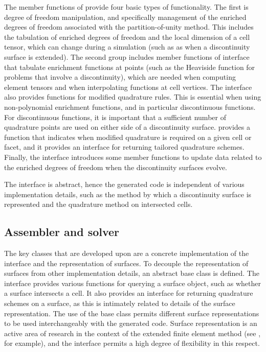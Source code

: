 The member functions of  provide four basic types
of functionality. The first is degree of freedom manipulation, and
specifically management of the enriched degrees of freedom associated
with the partition-of-unity method.  This includes the tabulation of
enriched degrees of freedom and the local dimension of a cell tensor,
which can change during a simulation (such as as when a discontinuity
surface is extended). The second group includes member functions
of  interface that tabulate enrichment functions at
points (such as the Heaviside function for problems that involve a
discontinuity), which are needed when computing element tensors and
when interpolating functions at cell vertices. The 
interface also provides functions for modified quadrature rules. This
is essential when using non-polynomial enrichment functions, and in
particular discontinuous functions. For discontinuous functions, it is
important that a sufficient number of quadrature points are used on either
side of a discontinuity surface.  provides a function
that indicates when modified quadrature is required on a given cell or
facet, and it provides an interface for returning tailored quadrature
schemes. Finally, the  interface introduces some member
functions to update data related to the enriched degrees of freedom when
the discontinuity surfaces evolve.

The  interface is abstract, hence the generated code
is independent of various implementation details, such as the method by
which a discontinuity surface is represented and the quadrature method
on intersected cells.

\subsection{Assembler and solver}

The key classes that are developed upon \dolfin{} are a concrete
implementation of the  interface and the representation
of surfaces. To decouple the representation of surfaces from other
implementation details, an abstract base class  is
defined. The  interface provides various functions
for querying a surface object, such as whether a surface intersects
a cell.  It also provides an interface for returning quadrature
schemes on a surface, as this is intimately related to details of the
surface representation.  The use of the base class 
permits different surface representations to be used interchangeably
with the generated code. Surface representation is an active area
of research in the context of the extended finite element method (see
\citet{JagerSteinmannKuhl2008}, for example), and the 
interface permits a high degree of flexibility in this respect.

